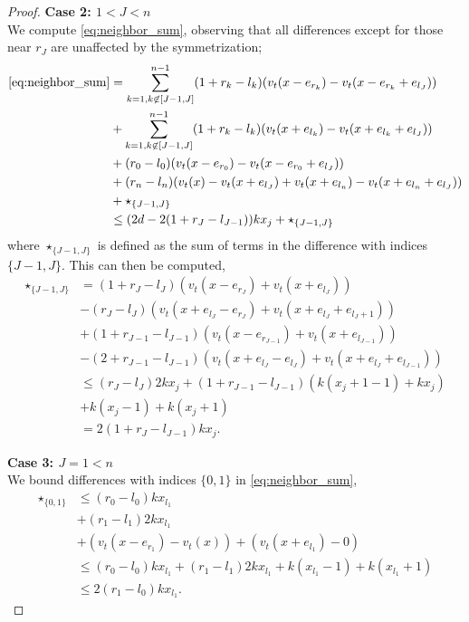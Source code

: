 \documentclass[12pt]{amsart}
\begin{document}
\begin{proof}
	{\bf Case 2: $1 < J < n$}\\
	We compute \eqref{eq:neighbor_sum}, observing that all differences except for those near $r_J$ are unaffected
	by the symmetrization; 
	\begin{align*}
	\eqref{eq:neighbor_sum} &= \sum_{k=1, k \not \in [J-1,J]}^{n-1} (1 + r_k - l_k) ( v_t(x - e_{r_k}) - v_t(x-e_{r_k} + e_{l_J})) \\
	&+\sum_{k=1, k \not \in [J-1,J]}^{n-1} (1 + r_k - l_k) (v_t(x + e_{l_k}) - v_t(x + e_{l_k} + e_{l_J})) \\
	&+  (r_0 - l_0)  (v_t(x - e_{r_0}) - v_t(x - e_{r_0} + e_{l_J})) \\
	&+ (r_n - l_n)  ( v_t(x)  - v_t(x + e_{l_J})  + v_t(x+e_{l_n}) - v_t(x + e_{l_n} + e_{l_J}))   \\
	&+ \star_{\{J-1,J\}} \\
	&\leq (2 d - 2 (1 + r_J - l_{J-1})) k x_{j}  + \star_{\{J-1,J\}} 
	\end{align*}
	where $\star_{\{J-1,J\}}$ is defined as the sum of terms in the difference with indices $\{J-1,J\}$. 
	This can then be computed,
	\begin{align*}
	\star_{\{J-1,J\}}  &= (1 + r_J - l_J) ( v_t(x - e_{r_J}) + v_t(x + e_{l_J})) \\
	&- (r_J - l_J) ( v_t(x + e_{l_J} - e_{r_J}) + v_t(x +e_{l_J} + e_{l_{J} + 1})) \\
	&+  (1 + r_{J-1} - l_{J-1})( v_t(x - e_{r_{J-1}}) + v_t(x + e_{l_{J-1}})) \\
	&- (2 + r_{J-1} -  l_{J-1}) ( v_t(x + e_{l_J} - e_{l_J}) + v_t(x + e_{l_J} + e_{l_{J-1}})) \\
	&\leq (r_J - l_J) 2 k x_j +  (1 + r_{J-1} - l_{J-1})( k (x_j+1-1) + k x_j) \\
	&+ k (x_{j}-1)  + k(x_j + 1)  \\
	&=  2 (1 + r_J - l_{J-1})  k x_j.
	\end{align*}

	{\bf Case 3: $J = 1 < n$} \\
	We bound differences with indices $\{0,1\}$ in \eqref{eq:neighbor_sum},
	\begin{align*} 
	\star_{\{0,1\}} 
	&\leq  (r_0 -l_0) k x_{l_1} \\
	&+ (r_1 - l_1) 2 k x_{l_1} \\
	&+ ( v_t(x - e_{r_1}) - v_t(x)) +   (v_t(x + e_{l_1})  - 0) \\
	&\leq (r_0 -l_0) k x_{l_1}  +  (r_1 - l_1) 2 k x_{l_1} +k  ( x_{l_1} - 1) + k (x_{l_1} + 1) \\ 
	&\leq    2 (r_1 - l_0)  k x_{l_1}.
	\end{align*}




\end{proof}
\end{document}
